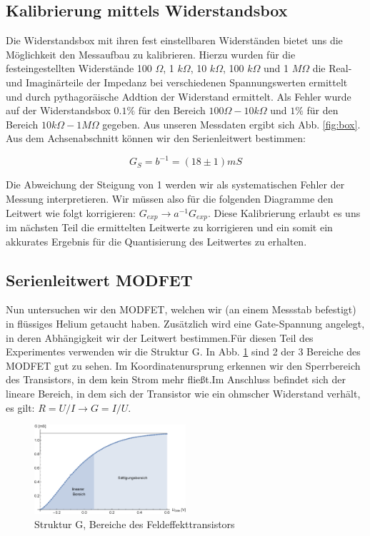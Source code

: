 \documentclass[aps,twocolumn,secnumarabic,nobalancelastpage,amsmath,amssymb,
nofootinbib,superscriptaddress]{revtex4-1}
\begin{document}
\subsection{Kalibrierung mittels Widerstandsbox}
Die Widerstandsbox mit ihren fest einstellbaren Widerständen bietet uns die
Möglichkeit den Messaufbau zu kalibrieren. Hierzu wurden für die festeingestellten
Widerstände 100 $\Omega$, 1 $k\Omega$, 10 $k\Omega$, 100 $k\Omega$ und 1 $M\Omega$
die Real- und Imaginärteile der Impedanz bei verschiedenen Spannungswerten ermittelt
und durch pythagoräische Addtion der Widerstand ermittelt. Als Fehler wurde auf der
Widerstandsbox $0.1\%$ für den Bereich $100\Omega - 10k\Omega$ und $1\%$ für den
Bereich $10k\Omega - 1M\Omega$ gegeben. Aus unseren Messdaten ergibt sich Abb.
\ref{fig:box}. Aus dem Achsenabschnitt können wir den Serienleitwert bestimmen:

  \begin{equation}
    G_S = b^{-1} = (18 \pm 1) mS
  \end{equation}

Die Abweichung der Steigung von 1 werden wir als systematischen Fehler der Messung
interpretieren. Wir müssen also für die folgenden Diagramme den Leitwert wie folgt
korrigieren: $G_{exp} \rightarrow a^{-1} G_{exp}$. Diese Kalibrierung erlaubt es
uns im nächsten Teil die ermittelten Leitwerte zu korrigieren und ein somit ein
akkurates Ergebnis für die Quantisierung des Leitwertes zu erhalten.


\subsection{Serienleitwert MODFET}
Nun untersuchen wir den MODFET, welchen wir (an einem Messstab befestigt) in
flüssiges Helium getaucht haben. Zusätzlich wird eine Gate-Spannung angelegt,
in deren Abhängigkeit wir der Leitwert bestimmen.Für diesen Teil des Experimentes
verwenden wir die Struktur G. In Abb. \ref{fig:G} sind 2 der 3 Bereiche des MODFET
gut zu sehen. Im Koordinatenursprung erkennen wir den Sperrbereich des Transistors,
in dem kein Strom mehr fließt.Im Anschluss befindet sich der lineare Bereich, in
dem sich der Transistor wie ein ohmscher Widerstand verhält, es gilt:
$R = U/I \rightarrow G = I/U$.

\begin{figure}[h]
  \centering
  \includegraphics[width=0.5\textwidth]{Berechnung-Bilder/g.eps}
  \caption{Struktur G, Bereiche des Feldeffekttransistors}
  \label{fig:G}
\end{figure}
\end{document}
